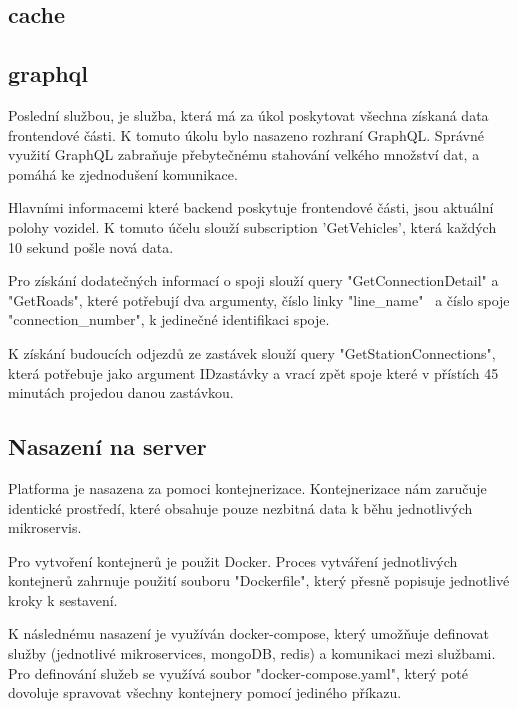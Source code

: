 \subsection {cache}

\subsection {graphql}\label{mainBackend}
Poslední službou, je služba, která má za úkol poskytovat všechna získaná data frontendové části. K tomuto úkolu bylo nasazeno rozhraní GraphQL. Správné využití GraphQL zabraňuje přebytečnému stahování velkého množství dat, a pomáhá ke zjednodušení komunikace.\par
Hlavními informacemi které backend poskytuje frontendové části, jsou aktuální polohy vozidel. K tomuto účelu slouží subscription 'GetVehicles', která každých 10 sekund pošle nová data.\par
Pro získání dodatečných informací o spoji slouží query "GetConnectionDetail" a "GetRoads", které potřebují dva argumenty, číslo linky "line\_name" \ a číslo spoje "connection\_number", k jedinečné identifikaci spoje.\par
K získání budoucích odjezdů ze zastávek slouží query "GetStationConnections", která potřebuje jako argument IDzastávky a vrací zpět spoje které v přístích 45 minutách projedou danou zastávkou.
\subsection{Nasazení na server}
Platforma je nasazena za pomoci kontejnerizace. Kontejnerizace nám zaručuje identické prostředí, které obsahuje pouze nezbitná data k běhu jednotlivých mikroservis.\par
Pro vytvoření kontejnerů je použit Docker. Proces vytváření jednotlivých kontejnerů zahrnuje použití souboru "Dockerfile", který přesně popisuje jednotlivé kroky k sestavení.\par
K následnému nasazení je využíván docker-compose, který umožňuje definovat služby (jednotlivé mikroservices, mongoDB, redis) a komunikaci mezi službami. Pro definování služeb se využívá soubor "docker-compose.yaml", který poté dovoluje spravovat všechny kontejnery pomocí jediného příkazu.
